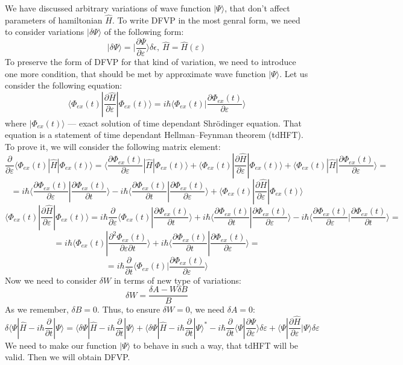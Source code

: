We have discussed arbitrary variations of wave function $|\Psi\rangle$, that don't affect parameters of hamiltonian $\hat{H}$.
To write DFVP in the most genral form, we need to consider variations $|\delta\Psi\rangle$ of the following form:
$$|\delta\Psi\rangle=|\frac{\partial\Psi}{\partial\varepsilon}\rangle\delta\epsilon,\ \hat{H}=\hat{H}(\varepsilon)$$
To preserve the form of DFVP for that kind of variation, we need to introduce one more condition, 
that should be met by approximate wave function $|\Psi\rangle$.
Let us consider the following equation:
$$\langle\Phi_{ex}(t)|\frac{\partial\hat{H}}{\partial\varepsilon}|\Phi_{ex}(t)\rangle = %
  i\hbar\langle\Phi_{ex}(t)|\frac{\partial\Phi_{ex}(t)}{\partial\varepsilon}\rangle$$
where $|\Phi_{ex}(t)\rangle$ --- exact solution of time dependant Shr\"{o}dinger equation.
That equation is a statement of time dependant Hellman--Feynman theorem (tdHFT). 
To prove it, we will consider the following matrix element:
$$\frac{\partial}{\partial\varepsilon}\langle\Phi_{ex}(t)|\hat{H}|\Phi_{ex}(t)\rangle=%
				      \langle\frac{\partial\Phi_{ex}(t)}{\partial\varepsilon}|\hat{H}|\Phi_{ex}(t)\rangle+%
				      \langle\Phi_{ex}(t)|\frac{\partial\hat{H}}{\partial\varepsilon}|\Phi_{ex}(t)\rangle+%
				      \langle\Phi_{ex}(t)|\hat{H}|\frac{\partial\Phi_{ex}(t)}{\partial\varepsilon}\rangle=$$
$$=i\hbar\langle\frac{\partial\Phi_{ex}(t)}{\partial\varepsilon}|\frac{\partial\Phi_{ex}(t)}{\partial t}\rangle-%
   i\hbar\langle\frac{\partial\Phi_{ex}(t)}{\partial t}|\frac{\partial\Phi_{ex}(t)}{\partial\varepsilon}\rangle+
   \langle\Phi_{ex}(t)|\frac{\partial\hat{H}}{\partial\varepsilon}|\Phi_{ex}(t)\rangle$$
$$\langle\Phi_{ex}(t)|\frac{\partial\hat{H}}{\partial\varepsilon}|\Phi_{ex}(t)\rangle=%
  i\hbar\frac{\partial}{\partial\varepsilon}\langle\Phi_{ex}(t)|\frac{\partial\Phi_{ex}(t)}{\partial t}\rangle+%
  i\hbar\langle\frac{\partial\Phi_{ex}(t)}{\partial t}|\frac{\partial\Phi_{ex}(t)}{\partial\varepsilon}\rangle-%
  i\hbar\langle\frac{\partial\Phi_{ex}(t)}{\partial\varepsilon}|\frac{\partial\Phi_{ex}(t)}{\partial t}\rangle=$$
$$=i\hbar\langle\Phi_{ex}(t)|\frac{\partial^2\Phi_{ex}(t)}{\partial\varepsilon\partial t}\rangle+%
   i\hbar\langle\frac{\partial\Phi_{ex}(t)}{\partial t}|\frac{\partial\Phi_{ex}(t)}{\partial\varepsilon}\rangle=$$
$$=i\hbar\frac{\partial}{\partial t}\langle\Phi_{ex}(t)|\frac{\partial\Phi_{ex}(t)}{\partial\varepsilon}\rangle$$
Now we need to consider $\delta W$ in terms of new type of variations:
$$\delta W = \frac{\delta A - W\delta B}{B}$$
As we remember, $\delta B = 0$. Thus, to ensure $\delta W = 0$, we need $\delta A = 0$:
$$\delta\langle\Psi|\hat{H}-i\hbar\frac{\partial}{\partial t}|\Psi\rangle=%
	\langle\delta\Psi|\hat{H}-i\hbar\frac{\partial}{\partial t}|\Psi\rangle + %
	\langle\delta\Psi|\hat{H}-i\hbar\frac{\partial}{\partial t}|\Psi\rangle^*-%
	i\hbar\frac{\partial}{\partial t}\langle\Psi|\frac{\partial\Psi}{\partial\varepsilon}\rangle\delta\varepsilon+%
	\langle\Psi|\frac{\partial\hat{H}}{\partial\varepsilon}|\Psi\rangle\delta\varepsilon
	$$
We need to make our function $|\Psi\rangle$ to behave in such a way, 
that tdHFT will be valid. 
Then we will obtain DFVP.
